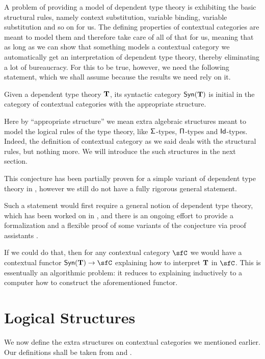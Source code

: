 A problem of providing a model of dependent type theory is exhibiting the
basic structural rules, namely context substitution, variable binding,
variable substitution and so on for us. The defining properties of contextual
categories are meant to model them and therefore 
take care of all of that for us, meaning that as long
as we can show that something models a contextual category we automatically get
an interpretation of dependent type theory, thereby eliminating a lot of
bureaucracy. For this to be true, however, we need the following statement,
which we shall assume because the results we need rely on it.

\begin{named}[Initiality]
  Given a dependent type theory $\operatorname{\mathbf{T}}$, its syntactic category $\mathsf{Syn}(\operatorname{\mathbf{T}})$ is
  initial in the category of contextual categories with the appropriate
  structure.
\end{named}

\begin{rmk}
Here by ``appropriate structure'' we mean extra algebraic structures meant to
model the
logical rules of the type theory, like $\operatorname{\mathsf{\Sigma}}$-types, $\operatorname{\mathsf{\Pi}}$-types and
$\operatorname{\mathsf{Id}}$-types. Indeed, the definition of contextual category as we said deals with
the structural rules, but nothing more. We will introduce the such structures in
the next section.
\end{rmk}

\begin{rmk}
This conjecture has been partially proven for a simple variant of dependent type
theory in \cite{Str91}, however we still do not have a fully rigorous general
statement.

Such a statement would first require a general notion of dependent type theory,
which has been worked on in \cite{Isa17, Uem19, Bru20, BHL20, NU22}, and
there is an ongoing effort to provide a formalization and a flexible proof of
some variants of the conjecture via proof assistants \cite{BL20}.

If we could do that, then for any contextual category $\sfC$ we would have a
contextual functor $\Syn{\T}\rightarrow\sfC$ explaining how to interpret $\operatorname{\mathbf{T}}$ in
$\sfC$. This is essentually an algorithmic problem: it reduces to explaining
inductively to a computer how to construct the aforementioned functor.
\end{rmk}

\section{Logical Structures}
We now define the extra structures on contextual categories we mentioned
earlier. Our definitions shall be taken from \cite{KL12} and \cite{KL18}.

